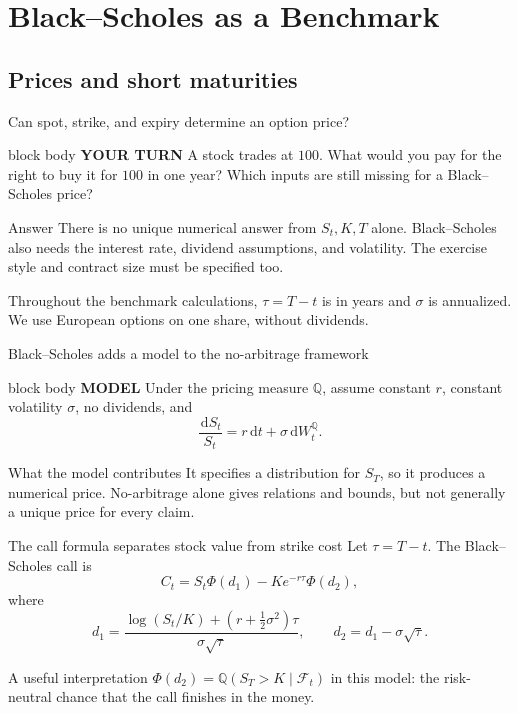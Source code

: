 \documentclass[handout,10pt,aspectratio=169]{beamer}
\newenvironment{modelbox}{\begin{beamercolorbox}[rounded=true,sep=0.7em,wd=\textwidth]{block body}
  \textbf{\color{CourseBlue}MODEL}\quad}{\end{beamercolorbox}}
\newenvironment{pausebox}{\begin{beamercolorbox}[rounded=true,sep=0.8em,wd=\textwidth]{block body}
  \textbf{\color{CourseGold}YOUR TURN}\quad}{\end{beamercolorbox}}
\newcommand{\dd}{\,\mathrm d}
\newcommand{\Q}{\mathbb Q}
\newcommand{\cF}{\mathcal F}
\newcommand{\1}{\mathbf 1}
\newcommand{\Ncdf}{\Phi}
\begin{document}
\section{Black--Scholes as a Benchmark}

\subsection{Prices and short maturities}

\begin{frame}{Can spot, strike, and expiry determine an option price?}
\begin{pausebox}
A stock trades at \(100\). What would you pay for the right to buy it
for \(100\) in one year? Which inputs are still missing for a
Black--Scholes price?
\end{pausebox}

\begin{exampleblock}{Answer}
There is no unique numerical answer from \(S_t,K,T\) alone.
Black--Scholes also needs the interest rate, dividend assumptions, and
volatility. The exercise style and contract size must be specified too.
\medskip

Throughout the benchmark calculations, \(\tau=T-t\) is in years and
\(\sigma\) is annualized. We use European options on one share, without dividends.
\end{exampleblock}
\end{frame}

\begin{frame}{Black--Scholes adds a model to the no-arbitrage framework}
\begin{modelbox}
Under the pricing measure \(\Q\), assume constant \(r\), constant
volatility \(\sigma\), no dividends, and
\[
\frac{\dd S_t}{S_t}=r\dd t+\sigma\dd W_t^{\Q}.
\]
\end{modelbox}
\begin{block}{What the model contributes}
It specifies a distribution for \(S_T\), so it produces a numerical price.
No-arbitrage alone gives relations and bounds, but not generally a unique
price for every claim.
\end{block}
\end{frame}

\begin{frame}{The call formula separates stock value from strike cost}
Let \(\tau=T-t\). The Black--Scholes call is
\[
\boxed{C_t=S_t\Ncdf(d_1)-Ke^{-r\tau}\Ncdf(d_2),}
\]
where
\[
d_1=\frac{\log(S_t/K)+(r+\tfrac12\sigma^2)\tau}{\sigma\sqrt{\tau}},
\qquad
d_2=d_1-\sigma\sqrt{\tau}.
\]
\begin{block}{A useful interpretation}
\(\Ncdf(d_2)=\Q(S_T>K\mid\cF_t)\) in this model: the risk-neutral chance
that the call finishes in the money.
\end{block}
\end{frame}
\end{document}
